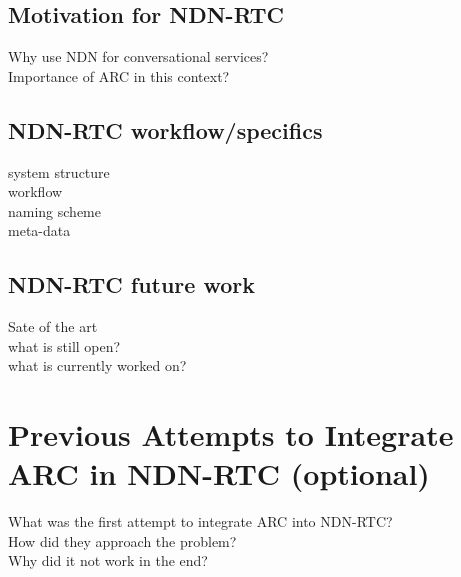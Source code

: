 \subsection{Motivation for NDN-RTC}
Why use NDN for conversational services? \\
Importance of ARC in this context?

\subsection{NDN-RTC workflow/specifics}
system structure \\
workflow \\
naming scheme \\
meta-data

\subsection{NDN-RTC future work}
Sate of the art \\
what is still open? \\
what is currently worked on?

\section{Previous Attempts to Integrate ARC in NDN-RTC (optional)}
What was the first attempt to integrate ARC into NDN-RTC? \\
How did they approach the problem? \\
Why did it not work in the end? \\

